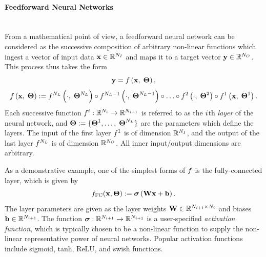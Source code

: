 \paragraph*{Feedforward Neural Networks}\mbox{}\\
%
From a mathematical point of view, a feedforward neural network can be considered as the successive composition of arbitrary non-linear functions which ingest a vector of input data $\nnInput \inROne{\numNNInput}$ and maps it to a target vector $\nnOutput \inROne{\numNNOutput}$. This process thus takes the form
%
\begin{equation}
	\nnOutput = \nnLayerFunc{\nnInput, \; \nnParams},
\end{equation}
\begin{equation}
	\nnLayerFunc{\nnInput, \; \nnParams} \defEq \nnLayerFuncIdx{\cdot, \; \nnParams^{\numLayers}}{\numLayers} \circ \nnLayerFuncIdx{\cdot, \; \nnParams^{\numLayers-1}}{\numLayers-1} \circ \hdots \circ \nnLayerFuncIdx{\cdot, \; \nnParams^{2}}{2} \circ \nnLayerFuncIdx{\nnInput, \; \nnParams^{1}}{1}.
\end{equation}
%
Each successive function $\funcMap{\nnLayerIdx{\dummyIdx}}{\ROne{N_{\dummyIdx}}}{\ROne{N_{\dummyIdx+1}}}$ is referred to as the $\dummyIdx$th \textit{layer} of the neural network, and $\nnParams \defEq \{\nnParams^{1}, \hdots, \; \nnParams^{\numLayers}\}$ are the parameters which define the layers. The input of the first layer $\nnLayer^1$ is of dimension $\ROne{\numNNInput}$, and the output of the last layer $\nnLayer^{\numLayers}$ is of dimension $\ROne{\numNNOutput}$. All inner input/output dimensions are arbitrary.

As a demonstrative example, one of the simplest forms of $\nnLayer$ is the fully-connected layer, which is given by
%
\begin{equation}
	\nnLayer_{\text{FC}}(\nnInput, \nnParams) \defEq \actFunc{\nnWeights \nnInput + \nnBias}.
\end{equation}
%
The layer parameters are given as the layer weights $\nnWeights \inRTwo{N_{\dummyIdx+1}}{N_{\dummyIdx}}$ and biases $\nnBias \inROne{N_{\dummyIdx+1}}$. The function $\funcMap{\nnAct}{\ROne{N_{\dummyIdx+1}}}{\ROne{N_{\dummyIdx+1}}}$ is a user-specified \textit{activation function}, which is typically chosen to be a non-linear function to supply the non-linear representative power of neural networks. Popular activation functions include sigmoid, tanh, ReLU, and swish functions.

